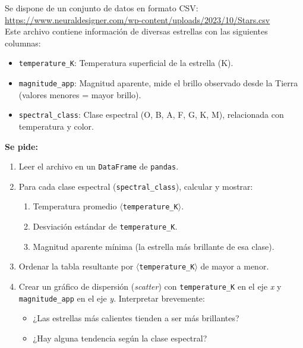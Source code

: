 \documentclass[10pt]{article}
\begin{document}

\begin{tcolorbox}[title={Pregunta 2 – Mini-catálogo HIPPARCOS}]

Se dispone de un conjunto de datos en formato CSV:\\
{\footnotesize
\url{https://www.neuraldesigner.com/wp-content/uploads/2023/10/Stars.csv}}\\

Este archivo contiene información de diversas estrellas con las siguientes columnas:

\begin{itemize}
    \item \texttt{temperature\_K}: Temperatura superficial de la estrella (K).
    \item \texttt{magnitude\_app}: Magnitud aparente, mide el brillo observado desde la Tierra (valores menores = mayor brillo).
    \item \texttt{spectral\_class}: Clase espectral (O, B, A, F, G, K, M), relacionada con temperatura y color.
\end{itemize}

\vspace{3mm}
\textbf{Se pide:}

\begin{enumerate}
    \item Leer el archivo en un \texttt{DataFrame} de \texttt{pandas}.
    
    \item Para cada clase espectral (\texttt{spectral\_class}), calcular y mostrar:
    \begin{enumerate}
        \item Temperatura promedio $\langle$\texttt{temperature\_K}$\rangle$.
        \item Desviación estándar de \texttt{temperature\_K}.
        \item Magnitud aparente mínima (la estrella más brillante de esa clase).
    \end{enumerate}

    \item Ordenar la tabla resultante por $\langle$\texttt{temperature\_K}$\rangle$ de mayor a menor.
    
    \item Crear un gráfico de dispersión (\textit{scatter}) con \texttt{temperature\_K} en el eje \textit{x} y \texttt{magnitude\_app} en el eje \textit{y}. Interpretar brevemente:
    
    \begin{itemize}
        \item ¿Las estrellas más calientes tienden a ser más brillantes?
        \item ¿Hay alguna tendencia según la clase espectral?
    \end{itemize}
\end{enumerate}

\end{tcolorbox}
\end{document}
